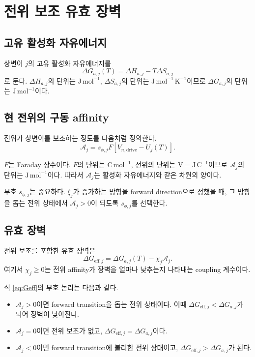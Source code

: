 \documentclass[11pt]{article}
\newcommand{\drive}{\mathrm{drive}}
\newcommand{\eff}{\mathrm{eff}}
\begin{document}
\section{전위 보조 유효 장벽}

\subsection{고유 활성화 자유에너지}

상변이 \(j\)의 고유 활성화 자유에너지를
\begin{equation}
\Delta G_{a,j}(T)
=
\Delta H_{a,j}
-T\Delta S_{a,j}
\label{eq:Ga}
\end{equation}
로 둔다. \(\Delta H_{a,j}\)의 단위는 \(\mathrm{J\,mol^{-1}}\), \(\Delta S_{a,j}\)의 단위는 \(\mathrm{J\,mol^{-1}\,K^{-1}}\)이므로 \(\Delta G_{a,j}\)의 단위는 \(\mathrm{J\,mol^{-1}}\)이다.

\subsection{현 전위의 구동 affinity}

전위가 상변이를 보조하는 정도를 다음처럼 정의한다.
\begin{equation}
\mathcal A_j
=
s_{\phi,j}F\left[V_{n,\drive}-U_j(T)\right].
\label{eq:affinity}
\end{equation}

\(F\)는 Faraday 상수이다. \(F\)의 단위는 \(\mathrm{C\,mol^{-1}}\), 전위의 단위는 \(\mathrm{V=J\,C^{-1}}\)이므로 \(\mathcal A_j\)의 단위는 \(\mathrm{J\,mol^{-1}}\)이다. 따라서 \(\mathcal A_j\)는 활성화 자유에너지와 같은 차원의 양이다.

부호 \(s_{\phi,j}\)는 중요하다. \(\xi_j\)가 증가하는 방향을 forward direction으로 정했을 때, 그 방향을 돕는 전위 상태에서 \(\mathcal A_j>0\)이 되도록 \(s_{\phi,j}\)를 선택한다.

\subsection{유효 장벽}

전위 보조를 포함한 유효 장벽은
\begin{equation}
\boxed{
\Delta G_{\eff,j}
=
\Delta G_{a,j}(T)-\chi_j\mathcal A_j .
}
\label{eq:Geff}
\end{equation}
여기서 \(\chi_j\ge0\)는 전위 affinity가 장벽을 얼마나 낮추는지 나타내는 coupling 계수이다.

식 \eqref{eq:Geff}의 부호 논리는 다음과 같다.
\begin{itemize}
\item \(\mathcal A_j>0\)이면 forward transition을 돕는 전위 상태이다. 이때 \(\Delta G_{\eff,j}<\Delta G_{a,j}\)가 되어 장벽이 낮아진다.
\item \(\mathcal A_j=0\)이면 전위 보조가 없고, \(\Delta G_{\eff,j}=\Delta G_{a,j}\)이다.
\item \(\mathcal A_j<0\)이면 forward transition에 불리한 전위 상태이고, \(\Delta G_{\eff,j}>\Delta G_{a,j}\)가 된다.
\end{itemize}
\end{document}
